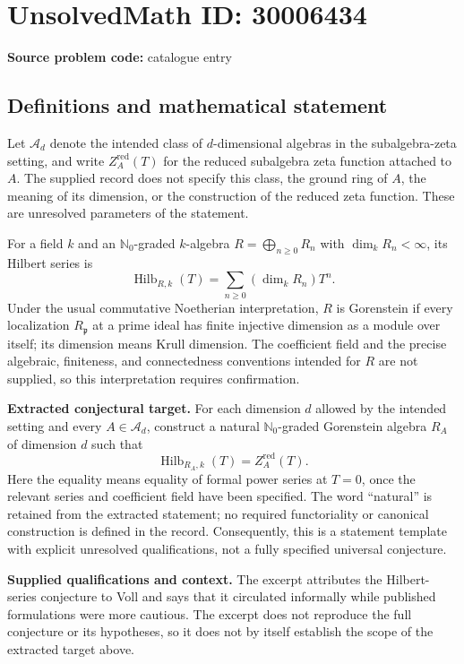 \documentclass[11pt]{article}
\newcommand{\N}{\mathbb{N}}
\begin{document}
\section*{UnsolvedMath ID: 30006434}
\textbf{Source problem code:} catalogue entry
\subsection{Definitions and mathematical statement}
Let \(\mathcal A_d\) denote the intended class of \(d\)-dimensional algebras in the subalgebra-zeta setting, and write \(Z_A^{\mathrm{red}}(T)\) for the reduced subalgebra zeta function attached to \(A\). The supplied record does not specify this class, the ground ring of \(A\), the meaning of its dimension, or the construction of the reduced zeta function. These are unresolved parameters of the statement.

For a field \(k\) and an \(\N_0\)-graded \(k\)-algebra \(R=\bigoplus_{n\geq 0}R_n\) with \(\dim_k R_n<\infty\), its Hilbert series is
\[
\operatorname{Hilb}_{R,k}(T)=\sum_{n\geq 0}(\dim_k R_n)T^n.
\]
Under the usual commutative Noetherian interpretation, \(R\) is Gorenstein if every localization \(R_{\mathfrak p}\) at a prime ideal has finite injective dimension as a module over itself; its dimension means Krull dimension. The coefficient field and the precise algebraic, finiteness, and connectedness conventions intended for \(R\) are not supplied, so this interpretation requires confirmation.

\textbf{Extracted conjectural target.} For each dimension \(d\) allowed by the intended setting and every \(A\in\mathcal A_d\), construct a natural \(\N_0\)-graded Gorenstein algebra \(R_A\) of dimension \(d\) such that
\[
\operatorname{Hilb}_{R_A,k}(T)=Z_A^{\mathrm{red}}(T).
\]
Here the equality means equality of formal power series at \(T=0\), once the relevant series and coefficient field have been specified. The word ``natural'' is retained from the extracted statement; no required functoriality or canonical construction is defined in the record. Consequently, this is a statement template with explicit unresolved qualifications, not a fully specified universal conjecture.

\textbf{Supplied qualifications and context.} The excerpt attributes the Hilbert-series conjecture to Voll and says that it circulated informally while published formulations were more cautious. The excerpt does not reproduce the full conjecture or its hypotheses, so it does not by itself establish the scope of the extracted target above.
\end{document}
